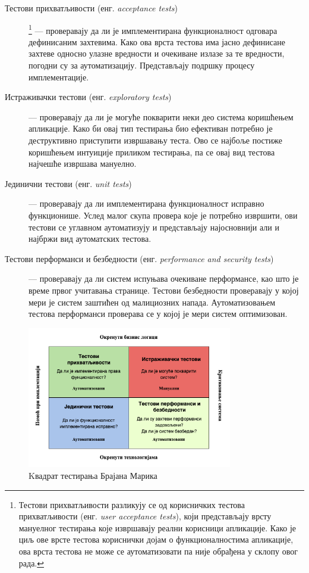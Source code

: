 \documentclass[12pt,oneside]{memoir}
\begin{document}
\begin{description}
\item[Тестови прихватљивости (енг. \textit{acceptance tests})]
\footnote{Тестови прихватљивости разликују се од корисничких тестова прихватљивости (енг. \textit{user acceptance tests}), који представљају врсту мануелног тестирања које извршавају реални корисници апликације. Како је циљ ове врсте тестова кориснички дојам о функционалностима апликације, ова врста тестова не може се аутоматизовати па није обрађена у склопу овог рада.}
--- проверавају да ли је имплементирана функционалност  одговара дефинисаним захтевима. Како ова врста тестова има јасно дефинисане захтеве односно улазне вредности и очекиване излазе за те вредности, погодни су за аутоматизацију. Представљају подршку процесу имплементације.

\item[Истраживачки тестови (енг. \textit{exploratory tests})] --- проверавају да ли је могуће покварити неки део система коришћењем апликације. Како би овај тип тестирања био ефективан потребно је деструктивно приступити извршавању теста. Ово се најбоље постиже коришћењем интуиције приликом тестирања, па се овај вид тестова најчешће извршава мануелно.

\item[Јединични тестови (енг. \textit{unit tests})] --- проверавају да ли имплементирана функционалност исправно функционише. Услед малог скупа провера које је потребно извршити, ови тестови се углавном аутоматизују и представљају најосновнији али и најбржи вид аутоматских тестова.

\item[Тестови перформанси и безбедности (енг. \textit{performance and security tests})]  --- проверавају да ли систем испуњава очекиване перформансе, као што је време првог учитавања странице. Тестови безбедности проверавају у којој мери је систем заштићен од малициозних напада. Аутоматизовањем тестова перформанси проверава се у којој је мери систем оптимизован.
\end{description}



\begin{figure}[!ht]
  \centering
  \includegraphics[width=0.8\textwidth]{matfmaster/img/kvadrat2.png}
  \caption{Kвадрат тестирања Брајана Марика}
  \label{fig:kvadrat}
\end{figure}
\end{document}
